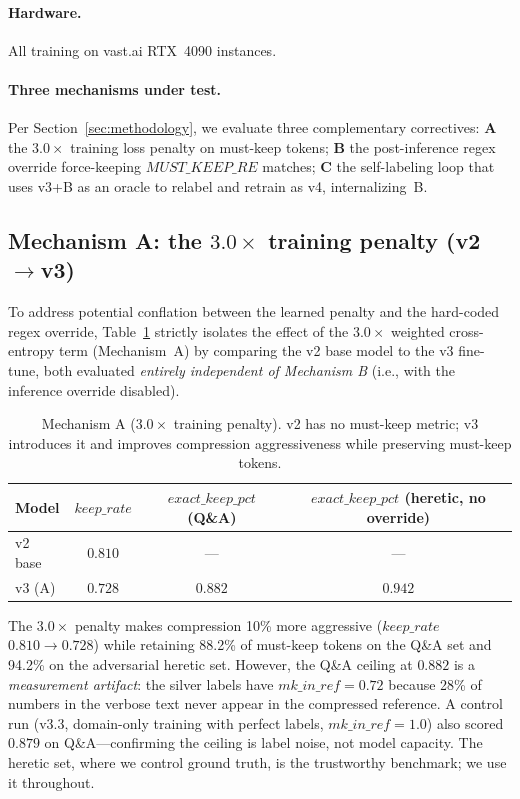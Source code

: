 \paragraph{Hardware.} All training on vast.ai RTX~4090 instances.

\paragraph{Three mechanisms under test.} Per
Section~\ref{sec:methodology}, we evaluate three complementary correctives:
\textbf{A} the $3.0\times$ training loss penalty on must-keep tokens;
\textbf{B} the post-inference regex override force-keeping
$\mathit{MUST\_KEEP\_RE}$ matches; \textbf{C} the self-labeling loop that uses
v3+B as an oracle to relabel and retrain as v4, internalizing~B.

\subsection{Mechanism A: the $3.0\times$ training penalty (v2$\to$v3)}
\label{sec:eval:A}

To address potential conflation between the learned penalty and the hard-coded
regex override, Table~\ref{tab:v2v3} strictly isolates the effect of the $3.0\times$ weighted
cross-entropy term (Mechanism~A) by comparing the v2 base model to the v3
fine-tune, both evaluated \emph{entirely independent of Mechanism B} (i.e., with
the inference override disabled).

\begin{table}[h]
\centering
\caption{Mechanism A ($3.0\times$ training penalty). v2 has no must-keep
metric; v3 introduces it and improves compression aggressiveness while
preserving must-keep tokens.}
\label{tab:v2v3}
\begin{tabular}{lccc}
\toprule
Model & $\mathit{keep\_rate}$ & $\mathit{exact\_keep\_pct}$ (Q\&A) & $\mathit{exact\_keep\_pct}$ (heretic, no override) \\
\midrule
v2 base & $0.810$ & --- & --- \\
v3 (A)  & $0.728$ & $0.882$ & $0.942$ \\
\bottomrule
\end{tabular}
\end{table}

The $3.0\times$ penalty makes compression 10\% more aggressive
($\mathit{keep\_rate}$ $0.810\to0.728$) while retaining 88.2\% of must-keep
tokens on the Q\&A set and 94.2\% on the adversarial heretic set. However,
the Q\&A ceiling at $0.882$ is a \emph{measurement artifact}: the silver
labels have $\mathit{mk\_in\_ref}=0.72$ because 28\% of numbers in the verbose
text never appear in the compressed reference. A control run (v3.3,
domain-only training with perfect labels, $\mathit{mk\_in\_ref}=1.0$) also
scored $0.879$ on Q\&A---confirming the ceiling is label noise, not model
capacity. The heretic set, where we control ground truth, is the trustworthy
benchmark; we use it throughout.

